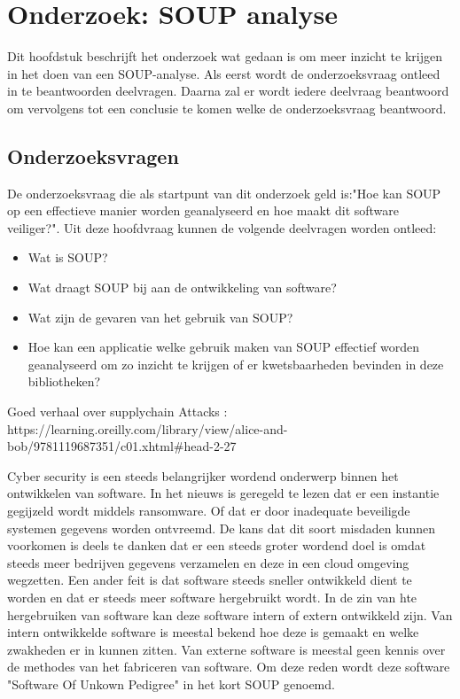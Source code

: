 
\chapter{Onderzoek: SOUP analyse}\label{ch:onderzoek:-SOUP-analyse}

Dit hoofdstuk beschrijft het onderzoek wat gedaan is om meer inzicht te krijgen in het doen van een SOUP-analyse. Als eerst wordt de onderzoeksvraag ontleed in te beantwoorden deelvragen. Daarna zal er wordt iedere deelvraag beantwoord om vervolgens tot een conclusie te komen welke de onderzoeksvraag beantwoord.


\section{Onderzoeksvragen} \label{sec:SOUPOnderzoeksvragen}
De onderzoeksvraag die als startpunt van dit onderzoek geld is:"Hoe kan SOUP op een effectieve manier worden geanalyseerd en hoe maakt dit software veiliger?". Uit deze hoofdvraag kunnen de volgende deelvragen worden ontleed:
\begin{itemize}
    \item Wat is SOUP?
    \item Wat draagt SOUP bij aan de ontwikkeling van software?
    \item Wat zijn de gevaren van het gebruik van SOUP?
    \item Hoe kan een applicatie welke gebruik maken van SOUP effectief worden geanalyseerd om zo inzicht te krijgen of er kwetsbaarheden bevinden in deze bibliotheken?
\end{itemize}

Goed verhaal over supplychain Attacks : https://learning.oreilly.com/library/view/alice-and-bob/9781119687351/c01.xhtml#head-2-27

Cyber security is een steeds belangrijker wordend onderwerp binnen het ontwikkelen van software. In het nieuws is geregeld te lezen dat er een instantie gegijzeld wordt middels ransomware. Of dat er door inadequate beveiligde systemen gegevens worden ontvreemd. De kans dat dit soort misdaden kunnen voorkomen is deels te danken dat er een steeds groter wordend doel is omdat steeds meer bedrijven gegevens verzamelen en deze in een cloud omgeving wegzetten. Een ander feit is dat software steeds sneller ontwikkeld dient te worden en dat er steeds meer software hergebruikt wordt. In de zin van hte hergebruiken van software kan deze software intern of extern ontwikkeld zijn. Van intern ontwikkelde software is meestal bekend hoe deze is gemaakt en welke zwakheden er in kunnen zitten. Van externe software is meestal geen kennis over de methodes van het fabriceren van software. Om deze reden wordt deze software "Software Of Unkown Pedigree" in het kort SOUP genoemd.


